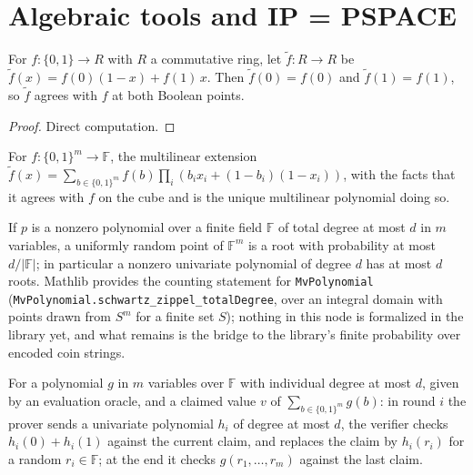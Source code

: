 \section{Algebraic tools and IP = PSPACE}

\begin{lemma}
  \label{lem:interaction-mle1}
  \leanok
  For $f : \{0,1\} \to R$ with $R$ a commutative ring, let
  $\widetilde{f} : R \to R$ be $\widetilde{f}(x) = f(0)(1 - x) + f(1)\,x$.
  Then $\widetilde{f}(0) = f(0)$ and
  $\widetilde{f}(1) = f(1)$, so $\widetilde{f}$ agrees with $f$ at both Boolean
  points.
\end{lemma}
\begin{proof}
  \leanok
  Direct computation.
\end{proof}

\begin{definition}
  \label{def:interaction-mle}
  For $f : \{0,1\}^m \to \mathbb{F}$, the multilinear extension
  $\widetilde{f}(x) = \sum_{b \in \{0,1\}^m} f(b) \prod_i
  (b_i x_i + (1 - b_i)(1 - x_i))$, with the facts that it agrees with $f$ on the
  cube and is the unique multilinear polynomial doing so.
\end{definition}

\begin{lemma}
  \label{lem:interaction-schwartz-zippel}
  If $p$ is a nonzero polynomial over a finite field $\mathbb{F}$ of total
  degree at most $d$ in $m$ variables, a uniformly random point of
  $\mathbb{F}^m$ is a root with probability at most $d / |\mathbb{F}|$; in
  particular a nonzero univariate polynomial of degree $d$ has at most $d$
  roots. Mathlib provides the counting statement for
  \texttt{MvPolynomial} (\texttt{MvPolynomial.schwartz\_zippel\_totalDegree},
  over an integral domain with points drawn from $S^m$ for a finite set $S$);
  nothing in this node is formalized in the library yet, and what remains is
  the bridge to the library's finite probability over encoded coin strings.
\end{lemma}

\begin{definition}
  \label{def:interaction-sumcheck}
  For a polynomial $g$ in $m$ variables over $\mathbb{F}$ with individual
  degree at most $d$, given by an evaluation oracle, and a claimed value $v$ of
  $\sum_{b \in \{0,1\}^m} g(b)$: in round $i$ the prover sends a univariate
  polynomial $h_i$ of degree at most $d$, the verifier checks
  $h_i(0) + h_i(1)$ against the current claim, and replaces the claim by
  $h_i(r_i)$ for a random $r_i \in \mathbb{F}$; at the end it checks
  $g(r_1, \dots, r_m)$ against the last claim.
\end{definition}

